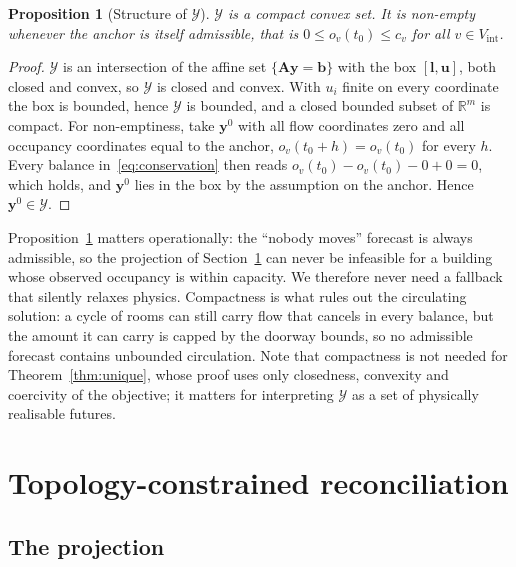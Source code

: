 \documentclass[utf8]{FrontiersinHarvard}
\newif\ifrevisionmarkup
\newcommand{\new}[1]{\ifrevisionmarkup\textcolor{revision}{#1}\else#1\fi}
\theoremstyle{plain}
\newtheorem{proposition}[theorem]{Proposition}
\theoremstyle{definition}
\theoremstyle{remark}
\newcommand{\bA}{\bm{A}}
\newcommand{\by}{\bm{y}}
\newcommand{\bb}{\bm{b}}
\newcommand{\cY}{\mathcal{Y}}
\newcommand{\Rb}{\mathbb{R}}
\begin{document}
\begin{proposition}[Structure of $\cY$]
\label{prop:convex}
$\cY$ is a \new{compact} convex set. It is non-empty whenever the anchor is itself admissible, that is $0 \le o_v(t_0) \le c_v$ for all $v \in V_{\mathrm{int}}$.
\end{proposition}
\begin{proof}
$\cY$ is an intersection of the affine set $\{\bA\by = \bb\}$ with the box $[\bm{l},\bm{u}]$, both closed and convex, so $\cY$ is closed and convex. \new{With $u_i$ finite on every coordinate the box is bounded, hence $\cY$ is bounded, and a closed bounded subset of $\Rb^m$ is compact.} For non-emptiness, take $\by^{0}$ with all flow coordinates zero and all occupancy coordinates equal to the anchor, $o_v(t_0+h) = o_v(t_0)$ for every $h$. Every balance in~\eqref{eq:conservation} then reads $o_v(t_0)-o_v(t_0)-0+0=0$, which holds, and $\by^{0}$ lies in the box by the assumption on the anchor. Hence $\by^{0} \in \cY$.
\end{proof}

Proposition~\ref{prop:convex} matters operationally: the ``nobody moves'' forecast is always admissible, so the projection of Section~\ref{sec:method} can never be infeasible for a building whose observed occupancy is within capacity. We therefore never need a fallback that silently relaxes physics. \new{Compactness is what rules out the circulating solution: a cycle of rooms can still carry flow that cancels in every balance, but the amount it can carry is capped by the doorway bounds, so no admissible forecast contains unbounded circulation. Note that compactness is not needed for Theorem~\ref{thm:unique}, whose proof uses only closedness, convexity and coercivity of the objective; it matters for interpreting $\cY$ as a set of physically realisable futures.}

\section{Topology-constrained reconciliation}
\label{sec:method}

\subsection{The projection}
\end{document}
